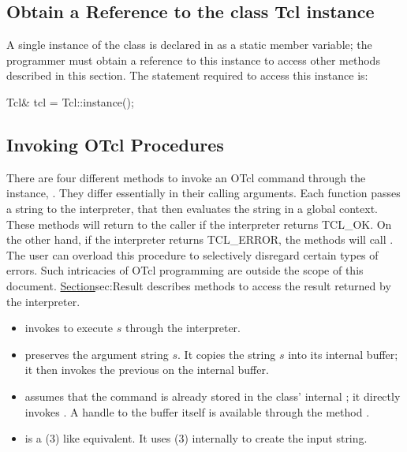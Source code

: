 \subsection{Obtain a Reference to the class Tcl instance}
\label{sec:instance}

A single instance of the class is declared in 
as a static member variable;
the programmer must obtain a reference to this instance
to access other methods described in this section.
The statement required to access this instance is:
\begin{program}
        Tcl& tcl = Tcl::instance();
\end{program}

\subsection{Invoking OTcl Procedures}
\label{sec:Invoke}
There are four different methods to invoke an OTcl command
through the instance, .
They differ essentially in their calling arguments.
Each function passes a string to the interpreter,
that then evaluates the string in a global context.
These methods will return to the caller if the interpreter returns TCL\_OK.
On the other hand, if the interpreter returns TCL\_ERROR,
the methods will call .
The user can overload this procedure to selectively disregard
certain types of errors.
Such intricacies of OTcl programming are outside the
scope of this document.
\href{The next section}{Section}{sec:Result}
describes methods to access the result returned by the interpreter.
\begin{itemize}\itemsep0pt
\item {}
  invokes  to execute $s$ through the interpreter.

\item {}
  preserves the argument string $s$.
  It copies the string $s$ into its internal buffer;
  it then invokes the previous  on the internal buffer.

\item {}
  assumes that the command is already stored in the class' internal
  ; it directly invokes .
  A handle to the buffer itself is available through the method
  .

\item
  is a (3) like equivalent.
  It uses (3) internally to create the input string.
\end{itemize}
